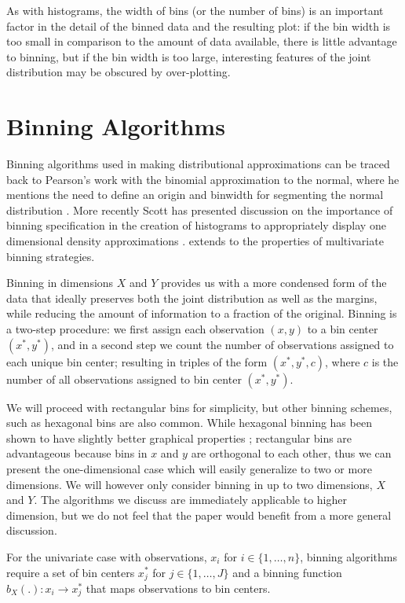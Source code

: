 As with histograms, the width of bins (or the number of bins) is an important factor in the detail of the binned data and the resulting plot: if the bin width is too small in comparison to the amount of data available, there is little advantage to binning, but if the bin width is too large, interesting features of the joint distribution may be obscured by over-plotting. 


\section{Binning Algorithms}
\label{GenBinning}

Binning algorithms used in making distributional approximations can be traced back to Pearson's work with the binomial approximation to the normal, where he mentions the need to define an origin and binwidth for segmenting the normal distribution \citep{Pearson1895}. More recently Scott has presented discussion on the importance of binning specification in the creation of histograms to appropriately display one dimensional density approximations \citep{scott1979}. \citet{scott1992} extends to the properties of multivariate binning strategies.

Binning in dimensions $X$ and $Y$ provides us with a more condensed form of the data that ideally preserves both the joint distribution as well as the margins, while reducing the amount of information to a fraction of the original.  Binning is a two-step procedure: we first assign each observation $(x, y)$ to a bin center $(x^\ast,y^\ast)$, and in a second step we count the number of observations assigned to each unique bin center; resulting in  triples  of the form $(x^\ast, y^\ast, c)$, where $c$ is the number of all observations assigned to bin center $(x^\ast,y^\ast)$.

We will proceed with rectangular bins for simplicity, but other binning schemes, such as hexagonal bins \citep{scatterplots} are also common.  While hexagonal binning has been shown to have slightly better graphical properties \citep{scott1992}; rectangular bins are advantageous because bins in $x$ and $y$ are orthogonal to each other, thus we can present the one-dimensional case which will easily generalize to two or more dimensions.  We will however only consider binning in up to two dimensions, $X$ and $Y$. The algorithms we discuss are immediately applicable to higher dimension, but we do not feel that the paper would benefit from a more general discussion.

For the univariate case with observations, $x_i$ for $i \in \{1,\dots,n\}$, binning algorithms require a set of bin centers $x_j^\ast$ for $j \in \{1,\dots,J\}$ and a binning function $b_X(.) : x_i \rightarrow x^\ast_j$ that maps observations to  bin centers. 

